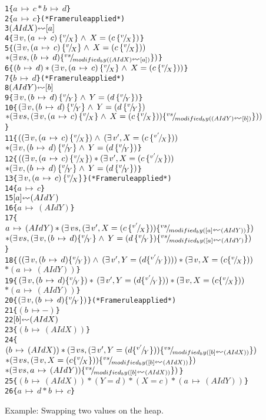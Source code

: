 \begin{figure}
\begin{alltt}
1  \{\( a\,\mapsto\,c * b\,\mapsto\,d \)\}
2     \{\( a\,\mapsto\,c \)\}                    (* Frame rule applied *)
3        \((AId X) \lsquigarr [ a ]\)
4     \{\( \exists\,v,(a\,\mapsto\,c)\,\subst{v}{X}\land\,X=(c\,\subst{v}{X}) \)\}
5  \{\( (\exists\,v,(a\,\mapsto\,c)\,\subst{v}{X}\land\,X=(c\,\subst{v}{X})) \)
      \(* (\exists\,vs,(b\,\mapsto\,d)\subst{vs}{modified_by((AId X)\lsquigarr[a])}) \)\}
6  \{\( (b\,\mapsto\,d)*(\exists\,v,(a\,\mapsto\,c)\,\subst{v}{X}\land\,X=(c\,\subst{v}{X})) \)\}
7     \{\( b\,\mapsto\,d \)\}                    (* Frame rule applied *)
8        \((AId Y) \lsquigarr [ b ]\)
9     \{\( \exists\,v,(b\,\mapsto\,d)\,\subst{v}{Y}\land\,Y=(d\,\subst{v}{Y}) \)\}
10 \{\( (\exists\,v,(b\,\mapsto\,d)\,\subst{v}{Y}\land\,Y=(d\,\subst{v}{Y}) \)
      \(* (\exists\,vs,(\exists\,v,(a\,\mapsto\,c)\,\subst{v}{X}\land\,X=(c\,\subst{v}{X}))\subst{vs}{modified_by((AId Y)\lsquigarr[b])})) \)\}
11 \{\( ((\exists\,v,(a\,\mapsto\,c)\,\subst{v}{X})\land\,(\exists\,v',X=(c\,\subst{v'}{X}))\)
      \(* (\exists\,v,(b\,\mapsto\,d)\,\subst{v}{Y}\land\,Y=(d\,\subst{v}{Y}) \)\}
12 \{\( ((\exists\,v,(a\,\mapsto\,c)\,\subst{v}{X})*(\exists\,v',X=(c\,\subst{v'}{X}))\)
      \(* (\exists\,v,(b\,\mapsto\,d)\,\subst{v}{Y}\land\,Y=(d\,\subst{v}{Y}) \)\}
13    \{\( \exists\,v,(a\,\mapsto\,c)\,\subst{v}{X} \)\}           (* Frame rule applied *)
14     \{\( a\,\mapsto\,c \)\}
15       \([ a ] \lsquigarr (AId Y)\)
16     \{\( a\,\mapsto\,(AId Y) \)\}
17 \{\( a\,\mapsto\,(AId Y)*(\exists\,vs,(\exists\,v',X=(c\,\subst{v'}{X}))\subst{vs}{modified_by([a]\lsquigarr(AId Y))}) \)
      \(* (\exists\,vs,(\exists\,v,(b\,\mapsto\,d)\subst{v}{Y}\land\,Y=(d\,\subst{v}{Y})\subst{vs}{modified_by([a]\lsquigarr(AId Y)}) \)\}
18 \{\( ((\exists\,v,(b\,\mapsto\,d)\subst{v}{Y})\land\,(\exists\,v',Y=(d\subst{v'}{Y})))*(\exists\,v,X=(c\subst{v}{X})) \)
      \(* (a\,\mapsto\,(AId Y)) \)\}
19 \{\( (\exists\,v,(b\,\mapsto\,d)\subst{v}{Y})*\,(\exists\,v',Y=(d\subst{v'}{Y}))*(\exists\,v,X=(c\subst{v}{X})) \)
      \(* (a\,\mapsto\,(AId Y)) \)\}
20    \{\( (\exists\,v,(b\,\mapsto\,d)\subst{v}{Y}) \)\}           (* Frame rule applied *)
21    \{\( (b\,\mapsto-) \)\}
22       \([ b ] \lsquigarr (AId X)\)
23    \{\( (b\,\mapsto\,(AId X)) \)\}
24 \{\( (b\,\mapsto\,(AId X))*(\exists\,vs,(\exists\,v',Y=(d\subst{v'}{Y}))\subst{vs}{modified_by([b]\lsquigarr(AId X))}) \)
      \(* (\exists\,vs,(\exists\,v,X=(c\subst{v}{X}))\subst{vs}{modified_by([b]\lsquigarr(AId X))}) \)
      \(* (\exists\,vs,a\,\mapsto\,(AId Y))\subst{vs}{modified_by([b]\lsquigarr(AId X))}) \)\}
25 \{\( (b\,\mapsto\,(AId X))*(Y=d)*(X=c)*(a\,\mapsto\,(AId Y)) \)\}
26 \{\({ a\,\mapsto\,d * b\,\mapsto\,c }\)\}
\end{alltt}
\caption{Example: Swapping two values on the heap.}
\label{fig:dec_example}
\end{figure}